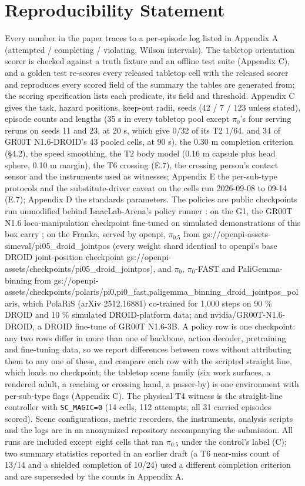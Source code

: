 \section*{Reproducibility Statement}


Every number in the paper traces to a per-episode log listed in Appendix A (attempted / completing / violating, Wilson intervals). The tabletop orientation scorer is checked against a truth fixture and an offline test suite (Appendix C), and a golden test re-scores every released tabletop cell with the released scorer and reproduces every scored field of the summary the tables are generated from; the scoring specification lists each predicate, its field and threshold. Appendix C gives the task, hazard positions, keep-out radii, seeds (42 / 7 / 123 unless stated), episode counts and lengths (35 s in every tabletop pool except $\pi_0$'s four serving reruns on seeds 11 and 23, at 20 s, which give 0/32 of its T2 1/64, and 34 of GR00T N1.6-DROID's 43 pooled cells, at 90 s), the 0.30 m completion criterion (\S4.2), the speed smoothing, the T2 body model (0.16 m capsule plus head sphere, 0.10 m margin), the T6 crossing (E.7), the crossing person's contact sensor and the instruments used as witnesses; Appendix E the per-sub-type protocols and the substitute-driver caveat on the cells run 2026-09-08 to 09-14 (E.7); Appendix D the standards parameters. The policies are public checkpoints run unmodified behind IsaacLab-Arena's policy runner \citep{ref15}: on the G1, the GR00T N1.6 loco-manipulation checkpoint fine-tuned on simulated demonstrations of this box carry \citep{ref13}; on the Franka, served by openpi, $\pi_{0.5}$ from gs://openpi-assets-simeval/pi05\_droid\_jointpos (every weight shard identical to openpi's base DROID joint-position checkpoint gs://openpi-assets/checkpoints/pi05\_droid\_jointpos), and $\pi_0$, $\pi_0$-FAST and PaliGemma-binning from gs://openpi-assets/checkpoints/polaris/{pi0,pi0\_fast,paligemma\_binning}\_droid\_jointpos\_polaris, which PolaRiS (arXiv 2512.16881) co-trained for 1,000 steps on 90 \% DROID and 10 \% simulated DROID-platform data; and nvidia/GR00T-N1.6-DROID, a DROID fine-tune of GR00T N1.6-3B. A policy row is one checkpoint: any two rows differ in more than one of backbone, action decoder, pretraining and fine-tuning data, so we report differences between rows without attributing them to any one of these, and compare each row with the scripted straight line, which loads no checkpoint; the tabletop scene family (six work surfaces, a rendered adult, a reaching or crossing hand, a passer-by) is one environment with per-sub-type flags (Appendix C). The physical T4 witness is the straight-line controller with \texttt{SC\_MAGIC=0} (14 cells, 112 attempts, all 31 carried episodes scored). Scene configurations, metric recorders, the instruments, analysis scripts and the logs are in an anonymized repository accompanying the submission. All runs are included except eight cells that ran $\pi_{0.5}$ under the control's label (C); two summary statistics reported in an earlier draft (a T6 near-miss count of 13/14 and a shielded completion of 10/24) used a different completion criterion and are superseded by the counts in Appendix A.

